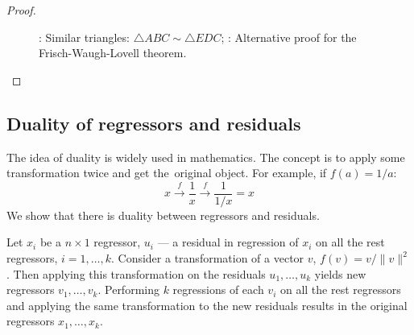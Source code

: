 \begin{proof}
\begin{figure}[ht!]
\begin{center}
\caption{: Similar triangles: $\bigtriangleup ABC \sim \bigtriangleup EDC$;
: Alternative proof for the Frisch-Waugh-Lovell theorem.}
\end{center}
\end{figure}
\end{proof}


\subsection{Duality of regressors and residuals}

The idea of duality is widely used in mathematics.
The concept is to apply some transformation twice and get the~original object.
For example, if $f(a) = 1/a$:
\[
x \stackrel{f}{\to} \frac{1}{x} \stackrel{f}{\to} \frac{1}{1/x} = x
\]
We show that there is duality between regressors and residuals.

\begin{theorem}
Let $x_i$ be a $n \times 1$ regressor,
$u_i$ — a residual in regression of $x_i$ on all the rest regressors,  $i = 1, \ldots, k$.
Consider a transformation of a vector $v$, $f(v) = v/\lVert v \rVert^2$.
Then applying this transformation on the residuals $u_1, \ldots, u_k$ yields
new regressors $v_1, \ldots, v_k$.
Performing $k$ regressions of each $v_i$ on all the rest regressors and
applying the same transformation to the new residuals results in
the original regressors $x_1, \ldots, x_k$.
\end{theorem}

